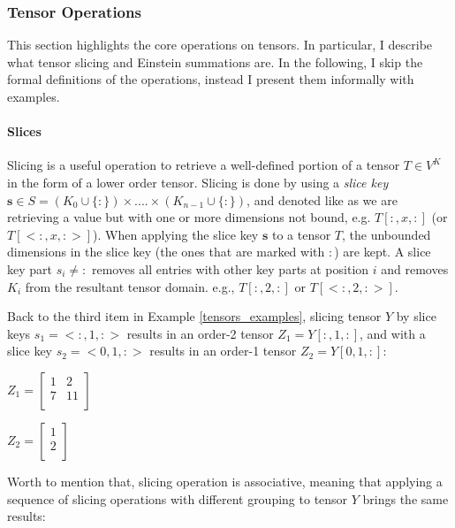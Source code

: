 \subsubsection{Tensor Operations}
\label{sec:tensor_operations}
This section highlights the core operations on tensors. In particular, I describe what tensor slicing and Einstein summations are. In the following, I skip the formal definitions of the operations, instead I present them informally with examples.


\paragraph{Slices} Slicing is a useful operation to retrieve a well-defined portion of a tensor $T \in V^{K}$ in the form of a lower order tensor. Slicing is done by using a \textit{slice key} $\textbf{s} \in S = (K_0 \cup \{:\}) \times .... \times ( K_{n-1}\cup \{:\})$, and denoted like as we are retrieving a value but with one or more dimensions not bound, e.g. $T[:, x, :]$ (or $T[<:, x, :>]$). 
When applying the slice key $\textbf{s}$ to a tensor $T$, the unbounded dimensions in the slice key (the ones that are marked with $:$) are kept. 
A slice key part $s_i \neq :$ removes
all entries with other key parts at position $i$ and removes $K_i$ from the resultant tensor domain. e.g., $T[:, 2, :]$ or $T[<:, 2, :>]$.

\begin{example}
	Back to the third item in Example \ref{tensors_examples}, slicing tensor $Y$ by slice keys $s_1 = <:, 1, :>$ results in an order-2 tensor $Z_1 = Y[:, 1, :]$, and with a slice key $s_2 = <0, 1, :>$ results in an order-1 tensor $Z_2 = Y[0, 1, :]$:\\
	
	 \centerline{$Z_1 = \left[ \begin{array}{cc} 1 & 2 \\ 7 & 11 \\ \end{array}\right]$}  
	 
	 
	 \centerline{$Z_2 = \left[ \begin{array}{c} 1 \\ 2 \\ \end{array}\right]$} 
\end{example}

Worth to mention that, slicing operation is associative, meaning that applying a sequence of slicing operations with different grouping to tensor $Y$ brings the same results:

